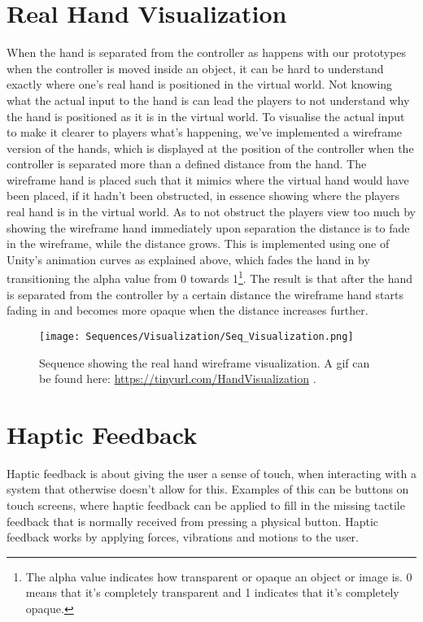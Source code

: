\section{Real Hand Visualization}
\label{sec:handVisualization}
When the hand is separated from the controller as happens with our prototypes when the controller is moved inside an object, it can be hard to understand exactly where one's real hand is positioned in the virtual world. Not knowing what the actual input to the hand is can lead the players to not understand why the hand is positioned as it is in the virtual world. To visualise the actual input to make it clearer to players what's happening, we've implemented a wireframe version of the hands, which is displayed at the position of the controller when the controller is separated more than a defined distance from the hand. The wireframe hand is placed such that it mimics where the virtual hand would have been placed, if it hadn't been obstructed, in essence showing where the players real hand is in the virtual world. As to not obstruct the players view too much by showing the wireframe hand immediately upon separation the distance is to fade in the wireframe, while the distance grows. This is implemented using one of Unity's animation curves as explained above, which fades the hand in by transitioning the alpha value from 0 towards 1\footnote{The alpha value indicates how transparent or opaque an object or image is. 0 means that it's completely transparent and 1 indicates that it's completely opaque.}. The result is that after the hand is separated from the controller by a certain distance the wireframe hand starts fading in and becomes more opaque when the distance increases further.

\begin{figure}[H]
\centering
\texttt{[image: Sequences/Visualization/Seq\_Visualization.png]}
\caption{Sequence showing the real hand wireframe visualization. A gif can be found here: \url{https://tinyurl.com/HandVisualization} .}
\label{fig:visualization}
\end{figure}

\section{Haptic Feedback}
\label{sec:hapticFeedback}
Haptic feedback is about giving the user a sense of touch, when interacting with a system that otherwise doesn't allow for this. Examples of this can be buttons on touch screens, where haptic feedback can be applied to fill in the missing tactile feedback that is normally received from pressing a physical button. Haptic feedback works by applying forces, vibrations and motions to the user.

